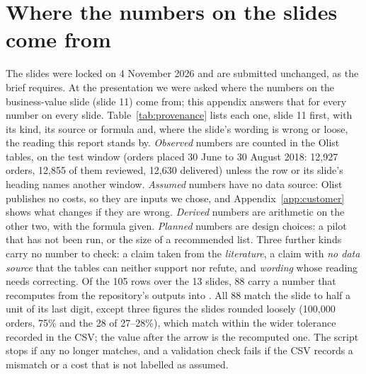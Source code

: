 \section{Where the numbers on the slides come from}
\label{app:provenance}

The slides were locked on 4 November 2026 and are submitted unchanged, as the
brief requires. At the presentation we were asked where the numbers on the
business-value slide (slide 11) come from; this appendix answers that for every
number on every slide. Table~\ref{tab:provenance} lists each one, slide 11 first,
with its kind, its source or formula and, where the slide's wording is wrong or
loose, the reading this report stands by. \emph{Observed} numbers are counted in
the Olist tables, on the test window (orders placed 30 June to 30 August 2018:
12{,}927 orders, 12{,}855 of them reviewed, 12{,}630 delivered) unless the row
or its slide's heading names another window. \emph{Assumed} numbers have no data source: Olist publishes
no costs, so they are inputs we chose, and Appendix~\ref{app:customer} shows what
changes if they are wrong. \emph{Derived} numbers are arithmetic on the other
two, with the formula given. \emph{Planned} numbers are design choices: a pilot that has
not been run, or the size of a recommended list. Three further kinds carry no number to check: a claim taken from the
\emph{literature}, a claim with \emph{no data source} that the tables can neither
support nor refute, and \emph{wording} whose reading needs correcting. Of the 105
rows over the 13 slides, 88 carry a number that 
recomputes from the repository's outputs into
. All 88 match the slide to half a
unit of its last digit, except three figures the slides rounded loosely
(100{,}000 orders, 75\% and the 28 of 27--28\%), which match within the
wider tolerance recorded in the CSV; the value after the arrow is the recomputed
one. The script stops if any no longer matches, and a validation check fails if
the CSV records a mismatch or a cost that is not labelled as assumed.



